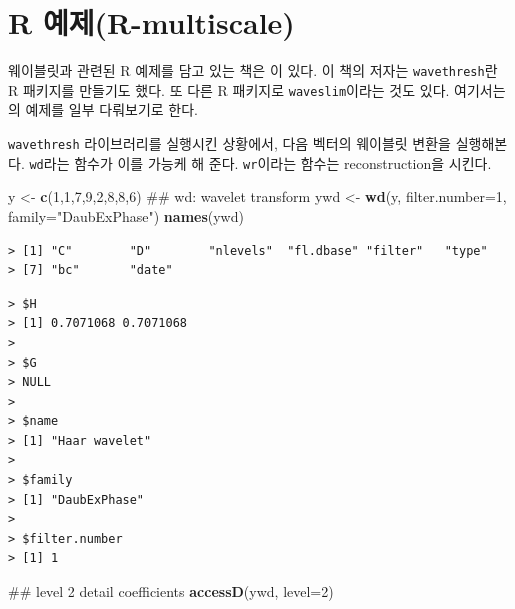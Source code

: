 \documentclass[b5paper,]{scrbook}
\makeatletter
\newenvironment{Shaded}{\begin{snugshade}}{\end{snugshade}}
\newcommand{\KeywordTok}[1]{\textcolor[rgb]{0.13,0.29,0.53}{\textbf{{#1}}}}
\newcommand{\DataTypeTok}[1]{\textcolor[rgb]{0.13,0.29,0.53}{{#1}}}
\newcommand{\DecValTok}[1]{\textcolor[rgb]{0.00,0.00,0.81}{{#1}}}
\newcommand{\StringTok}[1]{\textcolor[rgb]{0.31,0.60,0.02}{{#1}}}
\newcommand{\NormalTok}[1]{{#1}}
\theoremstyle{plain}
\theoremstyle{definition}
\numberwithin{equation}{section}
\newenvironment{kframe}{%
\medskip{}
\setlength{\fboxsep}{.8em}
 \def\at@end@of@kframe{}%
 \ifinner\ifhmode%
  \def\at@end@of@kframe{\end{minipage}}%
  \begin{minipage}{\columnwidth}%
 \fi\fi%
 \def\FrameCommand##1{\hskip\@totalleftmargin \hskip-\fboxsep
 \colorbox{shadecolor}{##1}\hskip-\fboxsep
     \hskip-\linewidth \hskip-\@totalleftmargin \hskip\columnwidth}%
 \MakeFramed {\advance\hsize-\width
   \@totalleftmargin\z@ \linewidth\hsize
   \@setminipage}}%
 {\par\unskip\endMakeFramed%
 \at@end@of@kframe}
\renewenvironment{Shaded}{\begin{kframe}}{\end{kframe}}
\makeatother
\begin{document}
\section{R 예제(R-multiscale)}\label{r-r-multiscale}

웨이블릿과 관련된 R 예제를 담고 있는 책은 \citep{Nason2010}이 있다. 이
책의 저자는 \texttt{wavethresh}란 R 패키지를 만들기도 했다. 또 다른 R
패키지로 \texttt{waveslim}이라는 것도 있다. 여기서는 \citep{Nason2010}의
예제를 일부 다뤄보기로 한다.

\texttt{wavethresh} 라이브러리를 실행시킨 상황에서, 다음 벡터의 웨이블릿
변환을 실행해본다. \texttt{wd}라는 함수가 이를 가능케 해 준다.
\texttt{wr}이라는 함수는 reconstruction을 시킨다.

\begin{Shaded}
\begin{Highlighting}[]
\NormalTok{y <-}\StringTok{ }\KeywordTok{c}\NormalTok{(}\DecValTok{1}\NormalTok{,}\DecValTok{1}\NormalTok{,}\DecValTok{7}\NormalTok{,}\DecValTok{9}\NormalTok{,}\DecValTok{2}\NormalTok{,}\DecValTok{8}\NormalTok{,}\DecValTok{8}\NormalTok{,}\DecValTok{6}\NormalTok{)}
\NormalTok{## wd: wavelet transform}
\NormalTok{ywd <-}\StringTok{ }\KeywordTok{wd}\NormalTok{(y, }\DataTypeTok{filter.number=}\DecValTok{1}\NormalTok{, }\DataTypeTok{family=}\StringTok{"DaubExPhase"}\NormalTok{)}
\KeywordTok{names}\NormalTok{(ywd)}
\end{Highlighting}
\end{Shaded}

\begin{verbatim}
> [1] "C"        "D"        "nlevels"  "fl.dbase" "filter"   "type"    
> [7] "bc"       "date"
\end{verbatim}

\begin{Shaded}
\end{Shaded}

\begin{verbatim}
> $H
> [1] 0.7071068 0.7071068
> 
> $G
> NULL
> 
> $name
> [1] "Haar wavelet"
> 
> $family
> [1] "DaubExPhase"
> 
> $filter.number
> [1] 1
\end{verbatim}

\begin{Shaded}
\begin{Highlighting}[]
\NormalTok{## level 2 detail coefficients}
\KeywordTok{accessD}\NormalTok{(ywd, }\DataTypeTok{level=}\DecValTok{2}\NormalTok{)}
\end{Highlighting}
\end{Shaded}
\end{document}
